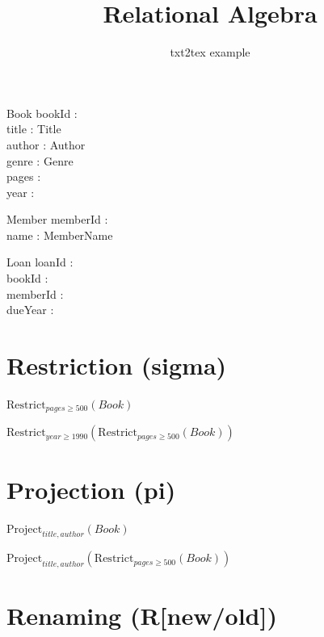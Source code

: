 \documentclass[a4paper,10pt,fleqn]{article}
\title{Relational Algebra}
\author{txt2tex example}
\begin{document}
\maketitle

\begin{zed}\end{zed}

\begin{schema}{Book}
bookId : \nat \\
title : Title \\
author : Author \\
genre : Genre \\
pages : \nat \\
year : \nat
\end{schema}

\begin{schema}{Member}
memberId : \nat \\
name : MemberName
\end{schema}

\begin{schema}{Loan}
loanId : \nat \\
bookId : \nat \\
memberId : \nat \\
dueYear : \nat
\end{schema}

\section*{Restriction (sigma)}

\noindent
$\mathrm{Restrict}_{pages \geq 500}(Book)$


\noindent
$\mathrm{Restrict}_{year \geq 1990}(\mathrm{Restrict}_{pages \geq 500}(Book))$


\section*{Projection (pi)}

\noindent
$\mathrm{Project}_{title, author}(Book)$


\noindent
$\mathrm{Project}_{title, author}(\mathrm{Restrict}_{pages \geq 500}(Book))$


\section*{Renaming (R[new/old])}
\end{document}

